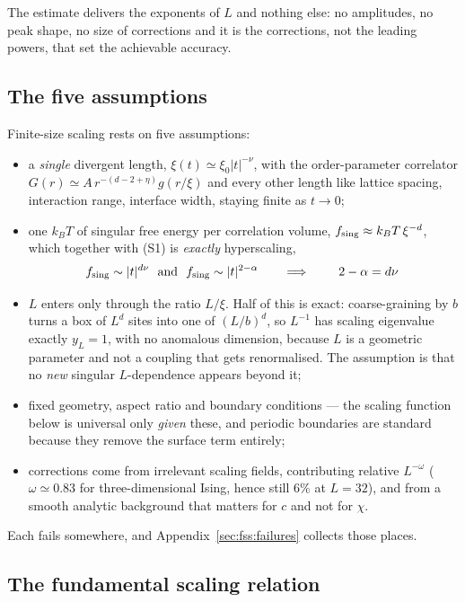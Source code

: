 \documentclass[10pt,a4paper]{article}
\theoremstyle{remark}
\begin{document}
The estimate delivers the exponents of $L$ and nothing else: no amplitudes, no
peak shape, no size of corrections and it is the corrections, not the leading
powers, that set the achievable accuracy.

\subsection{The five assumptions}
\label{sec:fss:assumptions}
\label{app:fssassumptions}
\label{app:fsspractice}

Finite-size scaling rests on five assumptions:
\begin{itemize}\setlength{\itemsep}{0pt}
\item[(S1)] a \emph{single} divergent length, $\xi(t)\simeq\xi_0|t|^{-\nu}$, with
the order-parameter correlator $G(r)\simeq A\,r^{-(d-2+\eta)}g(r/\xi)$ and every
other length like lattice spacing, interaction range, interface width,
staying finite as $t\to0$;
\item[(S2)] one $k_BT$ of singular free energy per correlation volume,
$f_{\rm sing}\approx k_BT\,\xi^{-d}$, which together with (S1) is \emph{exactly}
hyperscaling,
\[
f_{\rm sing}\sim|t|^{d\nu}\ \ \text{and}\ \ f_{\rm sing}\sim|t|^{2-\alpha}
\qquad\Longrightarrow\qquad
\;2-\alpha=d\nu\
\]
\item[(S3)] $L$ enters only through the ratio $L/\xi$. Half of this is exact:
coarse-graining by $b$ turns a box of $L^{d}$ sites into one of $(L/b)^{d}$, so
$L^{-1}$ has scaling eigenvalue exactly $y_L=1$, with no anomalous dimension,
because $L$ is a geometric parameter and not a coupling that gets renormalised.
The assumption is that no \emph{new} singular $L$-dependence appears beyond it;
\item[(S4)] fixed geometry, aspect ratio and boundary conditions --- the scaling
function below is universal only \emph{given} these, and periodic boundaries are
standard because they remove the surface term entirely;
\item[(S5)] corrections come from irrelevant scaling fields, contributing
relative $L^{-\omega}$ ($\omega\simeq0.83$ for three-dimensional Ising, hence
still $6\%$ at $L=32$), and from a smooth analytic background that matters for
$c$ and not for $\chi$.
\end{itemize}
Each fails somewhere, and Appendix~\ref{sec:fss:failures} collects those places.

\subsection{The fundamental scaling relation}
\label{sec:fss:fundamental}
\end{document}
